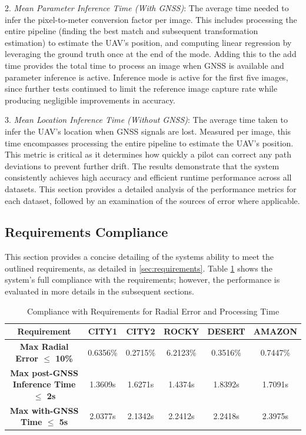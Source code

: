 2. \textit{Mean Parameter Inference Time (With GNSS)}: The average time needed to infer the pixel-to-meter conversion factor per image. This includes processing the entire pipeline (finding the best match and subsequent transformation estimation) to estimate the UAV's position, and computing linear regression by leveraging the ground truth once at the end of the mode. Adding this to the add time provides the total time to process an image when GNSS is available and parameter inference is active. Inference mode is active for the first five images, since further tests continued to limit the reference image capture rate while producing negligible improvements in accuracy.

3. \textit{Mean Location Inference Time (Without GNSS)}: The average time taken to infer the UAV's location when GNSS signals are lost. Measured per image, this time encompasses processing the entire pipeline to estimate the UAV's position. This metric is critical as it determines how quickly a pilot can correct any path deviations to prevent further drift.
The results demonstrate that the system consistently achieves high accuracy and efficient runtime performance across all datasets. This section provides a detailed analysis of the performance metrics for each dataset, followed by an examination of the sources of error where applicable.

\subsection{Requirements Compliance}

This section provides a concise detailing of the systems ability to meet the outlined requirements, as detailed in \ref{sec:requirements}. Table \ref{tab: Requirements} shows the system's full compliance with the requirements; however, the performance is evaluated in more details in the subsequent sections. 

\begin{table}[H]
    \centering
    \caption{Compliance with Requirements for Radial Error and Processing Time}
    \label{tab: Requirements}
    \begin{tabular}{|c|c|c|c|c|c|}
    \hline
    \textbf{Requirement} & \textbf{CITY1} & \textbf{CITY2} & \textbf{ROCKY} & \textbf{DESERT} & \textbf{AMAZON} \\ \hline
    \makecell{\textbf{Max Radial} \\ \textbf{Error $\leq$ 10\%}} & 0.6356\% & 0.2715\% & 6.2123\% & 0.3516\% & 0.7447\% \\ \hline
    \makecell{\textbf{Max post-GNSS} \\ \textbf{Inference Time $\leq$ 2s}} & 1.3609s & 1.6271s & 1.4374s & 1.8392s & 1.7091s \\ \hline
    \makecell{\textbf{Max with-GNSS} \\ \textbf{Time $\leq$ 5s}} & 2.0377s & 2.1342s & 2.2412s & 2.2418s & 2.3975s \\ \hline
    \end{tabular}
\end{table}
    


